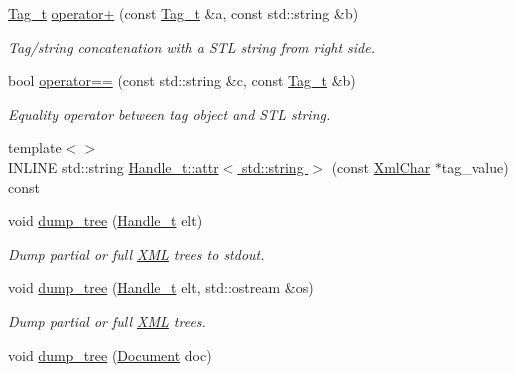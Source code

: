 \begin{DoxyCompactItemize}
\hyperlink{class_d_d4hep_1_1_x_m_l_1_1_tag__t}{Tag\_\-t} \hyperlink{group___d_d4_h_e_p___x_m_l_ga4296bedbf278d7bbd894b9e07bedf79a}{operator+} (const \hyperlink{class_d_d4hep_1_1_x_m_l_1_1_tag__t}{Tag\_\-t} \&a, const std::string \&b)
\begin{DoxyCompactList}\small\item\em Tag/string concatenation with a STL string from right side. \item\end{DoxyCompactList}\item 
bool \hyperlink{group___d_d4_h_e_p___x_m_l_ga147592045f1692bc1bce671299c71a77}{operator==} (const std::string \&c, const \hyperlink{class_d_d4hep_1_1_x_m_l_1_1_tag__t}{Tag\_\-t} \&b)
\begin{DoxyCompactList}\small\item\em Equality operator between tag object and STL string. \item\end{DoxyCompactList}\item 
{\footnotesize template$<$$>$ }\\INLINE std::string \hyperlink{namespace_d_d4hep_1_1_x_m_l_aed0b0dbb044dd52812ef73a41436b635}{Handle\_\-t::attr$<$ std::string $>$} (const \hyperlink{namespace_d_d4hep_1_1_x_m_l_a09e5d9cc86ed782f6826dfe0778c1815}{XmlChar} $\ast$tag\_\-value) const 
\item 
void \hyperlink{namespace_d_d4hep_1_1_x_m_l_ab1004ab7c53f769743d8bd09c7891fd7}{dump\_\-tree} (\hyperlink{class_d_d4hep_1_1_x_m_l_1_1_handle__t}{Handle\_\-t} elt)
\begin{DoxyCompactList}\small\item\em Dump partial or full \hyperlink{namespace_d_d4hep_1_1_x_m_l}{XML} trees to stdout. \item\end{DoxyCompactList}\item 
void \hyperlink{namespace_d_d4hep_1_1_x_m_l_ad133b21bd1bc50d23e939ac03960341b}{dump\_\-tree} (\hyperlink{class_d_d4hep_1_1_x_m_l_1_1_handle__t}{Handle\_\-t} elt, std::ostream \&os)
\begin{DoxyCompactList}\small\item\em Dump partial or full \hyperlink{namespace_d_d4hep_1_1_x_m_l}{XML} trees. \item\end{DoxyCompactList}\item 
void \hyperlink{namespace_d_d4hep_1_1_x_m_l_af7c204b171cd2ffe30308ce5ecdd5d44}{dump\_\-tree} (\hyperlink{class_d_d4hep_1_1_x_m_l_1_1_document}{Document} doc)

\end{DoxyCompactItemize}

